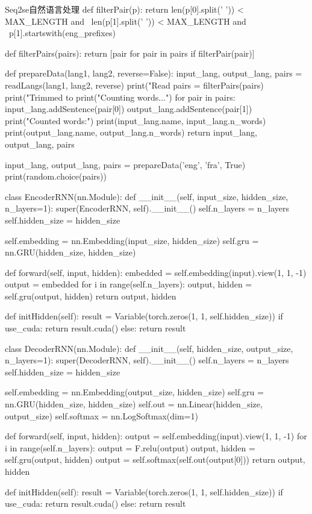 \documentclass[openbib]{article}
\begin{document}
\begin{Python}{Seq2se自然语言处理}
def filterPair(p):
	return len(p[0].split(' ')) < MAX_LENGTH and \
			len(p[1].split(' ')) < MAX_LENGTH and \
			p[1].startswith(eng_prefixes)

def filterPairs(pairs):
	return [pair for pair in pairs if filterPair(pair)]

def prepareData(lang1, lang2, reverse=False):
	input_lang, output_lang, pairs = readLangs(lang1, lang2, reverse)
	print("Read %
	pairs = filterPairs(pairs)
	print("Trimmed to %
	print("Counting words...")
	for pair in pairs:
		input_lang.addSentence(pair[0])
		output_lang.addSentence(pair[1])
	print("Counted words:")
	print(input_lang.name, input_lang.n_words)
	print(output_lang.name, output_lang.n_words)
	return input_lang, output_lang, pairs


input_lang, output_lang, pairs = prepareData('eng', 'fra', True)
print(random.choice(pairs))

class EncoderRNN(nn.Module):
	def __init__(self, input_size, hidden_size, n_layers=1):
		super(EncoderRNN, self).__init__()
		self.n_layers = n_layers
		self.hidden_size = hidden_size

		self.embedding = nn.Embedding(input_size, hidden_size)
		self.gru = nn.GRU(hidden_size, hidden_size)

	def forward(self, input, hidden):
		embedded = self.embedding(input).view(1, 1, -1)
		output = embedded
		for i in range(self.n_layers):
			output, hidden = self.gru(output, hidden)
		return output, hidden

	def initHidden(self):
		result = Variable(torch.zeros(1, 1, self.hidden_size))
		if use_cuda:
			return result.cuda()
		else:
			return result

class DecoderRNN(nn.Module):
	def __init__(self, hidden_size, output_size, n_layers=1):
		super(DecoderRNN, self).__init__()
		self.n_layers = n_layers
		self.hidden_size = hidden_size

		self.embedding = nn.Embedding(output_size, hidden_size)
		self.gru = nn.GRU(hidden_size, hidden_size)
		self.out = nn.Linear(hidden_size, output_size)
		self.softmax = nn.LogSoftmax(dim=1)

	def forward(self, input, hidden):
		output = self.embedding(input).view(1, 1, -1)
		for i in range(self.n_layers):
			output = F.relu(output)
			output, hidden = self.gru(output, hidden)
		output = self.softmax(self.out(output[0]))
		return output, hidden

	def initHidden(self):
		result = Variable(torch.zeros(1, 1, self.hidden_size))
		if use_cuda:
			return result.cuda()
		else:
			return result


\end{Python}
\end{document}
